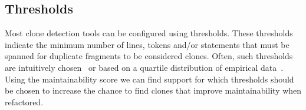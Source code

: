 \documentclass[]{IEEEtran}
\begin{document}
\subsection{Thresholds}
Most clone detection tools can be configured using thresholds. These thresholds indicate the minimum number of lines, tokens and/or statements that must be spanned for duplicate fragments to be considered clones. Often, such thresholds are intuitively chosen~\cite{li2006cp, roy2009mutation} or based on a quartile distribution of empirical data~\cite{alves2010deriving}. Using the maintainability score we can find support for which thresholds should be chosen to increase the chance to find clones that improve maintainability when refactored.


\end{document}
